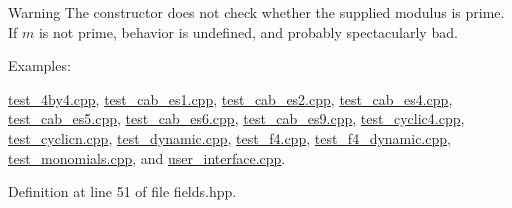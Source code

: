 \begin{DoxyWarning}{Warning}
The constructor does not check whether the supplied modulus is prime. If $m$ is not prime, behavior is undefined, and probably spectacularly bad. 
\end{DoxyWarning}
\begin{Desc}
\item[Examples\+: ]\par
\hyperlink{test_4by4_8cpp-example}{test\+\_\+4by4.\+cpp}, \hyperlink{test_cab_es1_8cpp-example}{test\+\_\+cab\+\_\+es1.\+cpp}, \hyperlink{test_cab_es2_8cpp-example}{test\+\_\+cab\+\_\+es2.\+cpp}, \hyperlink{test_cab_es4_8cpp-example}{test\+\_\+cab\+\_\+es4.\+cpp}, \hyperlink{test_cab_es5_8cpp-example}{test\+\_\+cab\+\_\+es5.\+cpp}, \hyperlink{test_cab_es6_8cpp-example}{test\+\_\+cab\+\_\+es6.\+cpp}, \hyperlink{test_cab_es9_8cpp-example}{test\+\_\+cab\+\_\+es9.\+cpp}, \hyperlink{test_cyclic4_8cpp-example}{test\+\_\+cyclic4.\+cpp}, \hyperlink{test_cyclicn_8cpp-example}{test\+\_\+cyclicn.\+cpp}, \hyperlink{test_dynamic_8cpp-example}{test\+\_\+dynamic.\+cpp}, \hyperlink{test_f4_8cpp-example}{test\+\_\+f4.\+cpp}, \hyperlink{test_f4_dynamic_8cpp-example}{test\+\_\+f4\+\_\+dynamic.\+cpp}, \hyperlink{test_monomials_8cpp-example}{test\+\_\+monomials.\+cpp}, and \hyperlink{user_interface_8cpp-example}{user\+\_\+interface.\+cpp}.\end{Desc}


Definition at line 51 of file fields.\+hpp.


